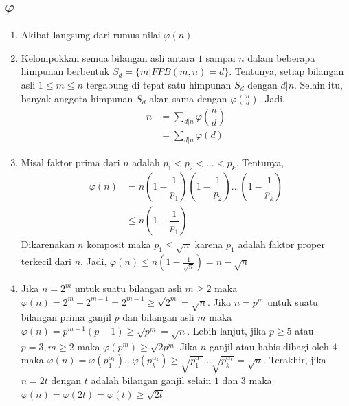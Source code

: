 \documentclass[11pt]{scrartcl}
\begin{document}
\subsection{$\varphi$}
\begin{enumerate}
    \item Akibat langsung dari rumus nilai $\varphi(n)$.
    \item Kelompokkan semua bilangan asli antara $1$ sampai $n$ dalam beberapa himpunan berbentuk $S_d = \{m| FPB(m, n) = d\}$. Tentunya, setiap bilangan asli $1 \leq m \leq n$ tergabung di tepat satu himpunan $S_d$ dengan $d|n$. Selain itu, banyak anggota himpunan $S_d$ akan sama dengan $\varphi\left(\frac{n}{d}\right)$. Jadi,
    \begin{align*}
        n &= \sum_{d|n} \varphi\left(\dfrac{n}{d}\right) \\
        &= \sum_{d|n} \varphi(d)
    \end{align*}
    \item Misal faktor prima dari $n$ adalah $p_1 < p_2 < ... < p_k$. Tentunya, 
    \begin{align*}
        \varphi(n) &= n\left(1 - \dfrac{1}{p_1}\right)\left(1 - \dfrac{1}{p_2}\right)...\left(1 - \dfrac{1}{p_k}\right) \\
        &\leq n\left(1 - \dfrac{1}{p_1}\right)
    \end{align*}
    Dikarenakan $n$ komposit maka $p_1 \leq \sqrt{n}$ karena $p_1$ adalah faktor proper terkecil dari $n$. Jadi, $\varphi(n) \leq n\left(1 - \frac{1}{\sqrt{n}}\right) = n - \sqrt{n}$
    \item Jika $n = 2^m$ untuk suatu bilangan asli $m \geq 2$ maka $\varphi(n) = 2^m - 2^{m - 1} = 2^{m - 1} \geq \sqrt{2^{m}} = \sqrt{n}$. 
    Jika $n = p^m$ untuk suatu bilangan prima ganjil $p$ dan bilangan asli $m$ maka $\varphi(n) = p^{m - 1}(p - 1) \geq \sqrt{p^m} = \sqrt{n}$. Lebih lanjut, jika $p \geq 5$ atau $p = 3, m \geq 2$ maka $\varphi(p^m) \geq \sqrt{2p^m}$  
    Jika $n$ ganjil atau habis dibagi oleh $4$ maka $\varphi(n) = \varphi\left(p_1^{\alpha_1}\right)...\varphi\left(p_k^{\alpha_k}\right) \geq \sqrt{p_1^{\alpha_1}}...\sqrt{p_k^{\alpha_k}} = \sqrt{n}$.
    Terakhir, jika $n = 2t$ dengan $t$ adalah bilangan ganjil selain $1$ dan $3$ maka $\varphi(n) = \varphi(2t) = \varphi(t) \geq \sqrt{2t}$
\end{enumerate}
\end{document}
